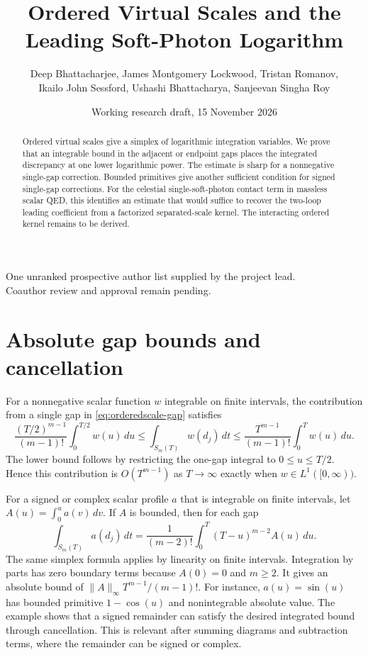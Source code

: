\documentclass[11pt]{article}
\title{Ordered Virtual Scales and the Leading Soft-Photon Logarithm}
\author{\normalsize Deep Bhattacharjee, James Montgomery Lockwood, Tristan Romanov,\\
\normalsize Ikailo John Sessford, Ushashi Bhattacharya, Sanjeevan Singha Roy}
\date{Working research draft, 15 November 2026}
\begin{document}
\maketitle
\begin{center}\small\color{teal!70!black}
One unranked prospective author list supplied by the project lead.\\
Coauthor review and approval remain pending.
\end{center}
\begin{abstract}
Ordered virtual scales give a simplex of logarithmic integration variables.
We prove that an integrable bound in the adjacent or endpoint gaps
places the integrated discrepancy at one lower logarithmic power.
The estimate is sharp for a nonnegative single-gap correction.
Bounded primitives give another sufficient condition for signed
single-gap corrections. For the celestial single-soft-photon contact
term in massless scalar QED, this identifies an estimate that would
suffice to recover the two-loop leading coefficient from a factorized
separated-scale kernel. The interacting ordered kernel remains to be
derived.
\end{abstract}



\section{Absolute gap bounds and cancellation}
For a nonnegative scalar function $w$ integrable on finite intervals,
the contribution from a single gap in \eqref{eq:orderedscale-gap}
satisfies
\[
 \frac{(T/2)^{m-1}}{(m-1)!}\int_0^{T/2} w(u)\,du
 \le \int_{S_m(T)} w(d_j)\,dt
 \le \frac{T^{m-1}}{(m-1)!}\int_0^T w(u)\,du .
\]
The lower bound follows by restricting the one-gap integral to
$0\le u\le T/2$. Hence this contribution is $O(T^{m-1})$ as
$T\to\infty$ exactly when $w\in L^1([0,\infty))$.

For a signed or complex scalar profile $a$ that is integrable on finite
intervals, let $A(u)=\int_0^u a(v)\,dv$. If $A$ is bounded, then for each gap
\[
 \int_{S_m(T)}a(d_j)\,dt
 =\frac1{(m-2)!}\int_0^T(T-u)^{m-2}A(u)\,du .
\]
The same simplex formula applies by linearity on finite intervals.
Integration by parts has zero boundary terms because $A(0)=0$ and
$m\ge2$. It gives an absolute bound of
$\|A\|_\infty T^{m-1}/(m-1)!$. For instance,
$a(u)=\sin(u)$ has bounded primitive $1-\cos(u)$ and nonintegrable
absolute value. The example shows that a signed remainder can satisfy
the desired integrated bound through cancellation. This is relevant
after summing diagrams and subtraction terms, where the remainder can
be signed or complex.
\end{document}
